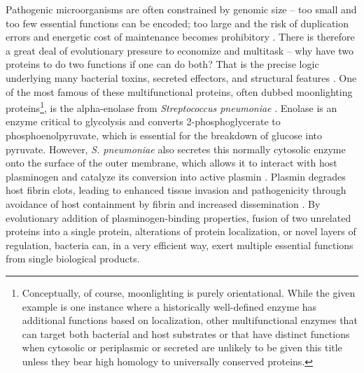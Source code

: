 Pathogenic microorganisms are often constrained by genomic size -- too small and too few essential functions can be encoded; too large and the risk of duplication errors and energetic cost of maintenance becomes prohibitory \citep{Ranea2005, Bobay2017, Huberts2010}. There is therefore a great deal of evolutionary pressure to economize and multitask -- why have two proteins to do two functions if one can do both? That is the precise logic underlying many bacterial toxins, secreted effectors, and structural features \citep{Gupta2019}. One of the most famous of these multifunctional proteins, often dubbed moonlighting proteins\footnote{Conceptually, of course, moonlighting is purely orientational. While the given example is one instance where a historically well\hyp{}defined enzyme has additional functions based on localization, other multifunctional enzymes that can target both bacterial and host substrates or that have distinct functions when cytosolic or periplasmic or secreted are unlikely to be given this title unless they bear high homology to universally conserved proteins.}, is the alpha\hyp{}enolase from \textit{Streptococcus pneumoniae} \citep{Bergmann2001}. Enolase is an enzyme critical to glycolysis and converts 2\hyp{}phosphoglycerate to phosphoenolpyruvate, which is essential for the breakdown of glucose into pyruvate. However, \textit{S. pneumoniae} also secretes this normally cytosolic enzyme onto the surface of the outer membrane, which allows it to interact with host plasminogen and catalyze its conversion into active plasmin \citep{Bergmann2013}. Plasmin degrades host fibrin clots, leading to enhanced tissue invasion and pathogenicity through avoidance of host containment by fibrin and increased dissemination \citep{Whiting2002, Weiser2018}. By evolutionary addition of plasminogen\hyp{}binding properties, fusion of two unrelated proteins into a single protein, alterations of protein localization, or novel layers of regulation, bacteria can, in a very efficient way, exert multiple essential functions from single biological products.

